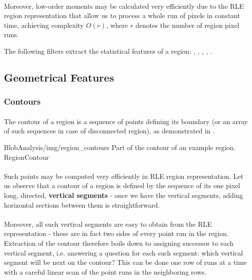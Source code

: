 \paragraph*{}
Moreover, low-order moments may be calculated very efficiently due to the RLE region representation that allow us to process a whole run of pixels in constant time, achieving complexity $O(r)$, where $r$ denotes the number of region pixel runs.

\begin{refImpl}
The following \studio filters extract the statistical features of a region: 
, 
, 
, 
,
. 
\end{refImpl}

\subsection{Geometrical Features}

\subsubsection{Contours}

\paragraph*{}
The contour of a region is a sequence of points defining its boundary (or an array of such sequences in case of disconnected region), as demonstrated in .

\oneFigure
{BlobAnalysis/img/region_contours}
{Part of the contour of an example region.}
{RegionContour}
{\basicWidth}

\paragraph*{}
Such points may be computed very efficiently in RLE region representation. Let us observe that a contour of a region is defined by the sequence of its one pixel long, directed, \textbf{vertical segments} - once we have the vertical segments, adding horizontal sections between them is straightforward. 

\paragraph*{}
Moreover, all such vertical segments are easy to obtain from the RLE representation - these are in fact two sides of every point run in the region. Extraction of the contour therefore boils down to assigning successor to each vertical segment, i.e. answering a question for each such segment: which vertical segment will be next on the contour? This can be done one row of runs at a time with a careful linear scan of the point runs in the neighboring rows.

